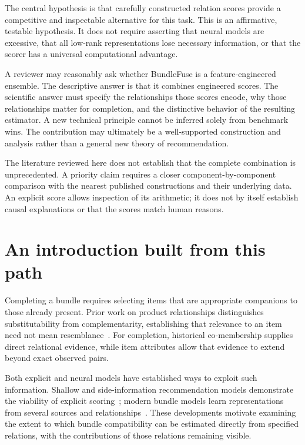 \documentclass[11pt,a4paper]{article}
\begin{document}
The central hypothesis is that carefully constructed relation scores provide a
competitive and inspectable alternative for this task. This is an affirmative,
testable hypothesis. It does not require asserting that neural models are excessive,
that all low-rank representations lose necessary information, or that the scorer
has a universal computational advantage.

A reviewer may reasonably ask whether BundleFuse is a feature-engineered ensemble.
The descriptive answer is that it combines engineered scores. The scientific answer
must specify the relationships those scores encode, why those relationships matter
for completion, and the distinctive behavior of the resulting estimator. A new
technical principle cannot be inferred solely from benchmark wins. The contribution
may ultimately be a well-supported construction and analysis rather than a general
new theory of recommendation.

The literature reviewed here does not establish that the complete combination is
unprecedented. A priority claim requires a closer component-by-component comparison
with the nearest published constructions and their underlying data. An explicit
score allows inspection of its arithmetic; it does not by itself establish causal
explanations or that the scores match human reasons.

\section{An introduction built from this path}
Completing a bundle requires selecting items that are appropriate companions to
those already present. Prior work on product relationships distinguishes
substitutability from complementarity, establishing that relevance to an item need
not mean resemblance~\cite{mcauley}. For completion, historical co-membership supplies
direct relational evidence, while item attributes allow that evidence to extend
beyond exact observed pairs.

Both explicit and neural models have established ways to exploit such information.
Shallow and side-information recommendation models demonstrate the viability of
explicit scoring~\cite{ease,sslim,fease}; modern bundle models learn representations
from several sources and relationships~\cite{clhe,ramen}. These developments motivate
examining the extent to which bundle compatibility can be estimated directly from
specified relations, with the contributions of those relations remaining visible.
\end{document}

